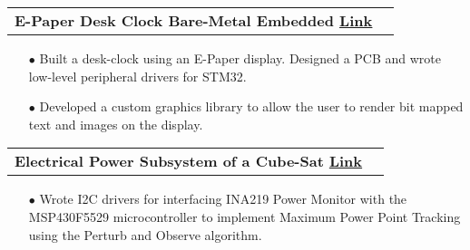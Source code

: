 \documentclass[11pt]{article}
\makeatletter
\newcommand{\resumeSubheadingP}[2]{
  \vspace{-2pt}\item
    \begin{tabular*}{1.0\textwidth}[t]{l@{\extracolsep{\fill}}r}
       \textbf{{\large #1}}&{#2} \\
    \end{tabular*}\vspace{-1pt}
}
\makeatother
\begin{document}
\resumeSubheadingP
{E-Paper Desk Clock \textbar{ } Bare-Metal Embedded \href{https://github.com/parthkharade/Eink-DeskClock}{\small{\textbar{ }\underline{Link} }}}{}
\begin{itemize}[leftmargin=0.3in]\setlength{\itemsep}{0pt}\setlength{\parskip}{0pt}\vspace{-0.2cm}
  \item[$\bullet$] Built a desk-clock using an E-Paper display. Designed a PCB and wrote low-level peripheral drivers for STM32. 
  \item[$\bullet$] Developed a custom graphics library  to allow the user to render bit mapped text and images on the display.
\end{itemize}
\vspace{-0.2cm}




%




\resumeSubheadingP
{Electrical Power Subsystem of a Cube-Sat \href{https://github.com/parthkharade/MSP430F5529}{\small{\textbar{ }\underline{Link} }}}{}
\begin{itemize}[leftmargin=0.3in]\setlength{\itemsep}{0pt}\setlength{\parskip}{0pt}\vspace{-0.2cm}
  \item[$\bullet$] Wrote I2C drivers for interfacing INA219 Power Monitor with the MSP430F5529 microcontroller to implement Maximum Power Point Tracking using the Perturb and Observe algorithm.
\end{itemize}
\vspace{-0.3cm}
\end{document}
